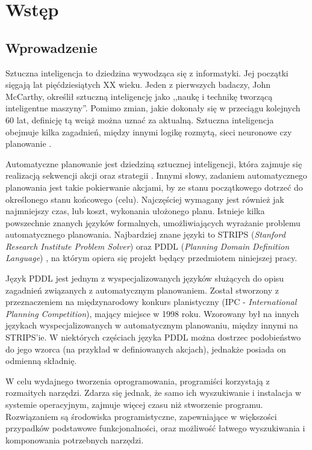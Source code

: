 \chapter{Wstęp}
\section{Wprowadzenie}
Sztuczna inteligencja to dziedzina wywodząca się z informatyki. Jej początki sięgają lat pięćdziesiątych XX wieku. Jeden z pierwszych badaczy,  John McCarthy, określił sztuczną inteligencję jako ,,naukę i technikę tworzącą inteligentne maszyny''. Pomimo zmian, jakie dokonały się w przeciągu kolejnych 60 lat, definicję tą wciąż można uznać za aktualną. Sztuczna inteligencja obejmuje kilka zagadnień, między innymi logikę rozmytą, sieci neuronowe czy planowanie \cite{ai}.

Automatyczne planowanie jest dziedziną sztucznej inteligencji, która zajmuje się realizacją sekwencji akcji oraz strategii \cite{planning}. Innymi słowy, zadaniem automatycznego planowania jest takie pokierwanie akcjami, by ze stanu początkowego dotrzeć do określonego stanu końcowego (celu). Najczęściej wymagany jest również jak najmniejszy czas, lub koszt, wykonania ułożonego planu. Istnieje kilka powszechnie znanych języków formalnych, umożliwiających wyrażanie problemu automatycznego planowania. Najbardziej znane języki to STRIPS (\textit{Stanford Research Institute Problem Solver}) \cite{strips} oraz PDDL (\textit{Planning Domain Definition Language}) \cite{pddl}, na którym opiera się projekt będący przedmiotem niniejszej pracy.
	
Język PDDL jest jednym z wyspecjalizowanych języków służących do opisu zagadnień związanych z automatycznym planowaniem. Został stworzony z przeznaczeniem na międzynarodowy konkurs planistyczny (IPC - \emph{International Planning Competition}), mający miejsce w 1998 roku. Wzorowany był na innych językach wyspecjalizowanych w automatycznym planowaniu, między innymi na STRIPS'ie. W niektórych częściach języka PDDL można dostrzec podobieństwo do jego wzorca (na przykład w definiowanych akcjach), jednakże posiada on odmienną składnię.   

W celu wydajnego tworzenia oprogramowania, programiści korzystają z rozmaitych narzędzi. Zdarza się jednak, że samo ich wyszukiwanie i instalacja w systemie operacyjnym, zajmuje więcej czasu niż stworzenie programu. Rozwiązaniem są środowiska programistyczne, zapewniające w większości przypadków podstawowe funkcjonalności, oraz możliwość łatwego wyszukiwania i komponowania potrzebnych narzędzi.

